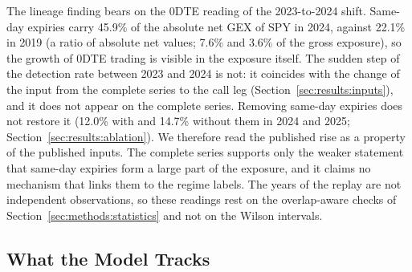 The lineage finding bears on the 0DTE reading of the 2023-to-2024 shift. Same-day expiries carry 45.9\% of the absolute net GEX of SPY in 2024, against 22.1\% in 2019 (a ratio of absolute net values; 7.6\% and 3.6\% of the gross exposure), so the growth of 0DTE trading is visible in the exposure itself. The sudden step of the detection rate between 2023 and 2024 is not: it coincides with the change of the input from the complete series to the call leg (Section~\ref{sec:results:inputs}), and it does not appear on the complete series. Removing same-day expiries does not restore it (12.0\% with and 14.7\% without them in 2024 and 2025; Section~\ref{sec:results:ablation}). We therefore read the published rise as a property of the published inputs. The complete series supports only the weaker statement that same-day expiries form a large part of the exposure, and it claims no mechanism that links them to the regime labels. The years of the replay are not independent observations, so these readings rest on the overlap-aware checks of Section~\ref{sec:methods:statistics} and not on the Wilson intervals.

\subsection{What the Model Tracks}
\label{sec:discussion:tracks}

